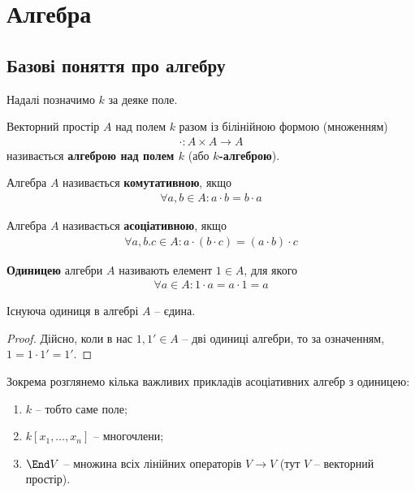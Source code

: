 \documentclass{math_library}
\begin{document}
\iffalse
\section{Алгебра}
\subsection{Базові поняття про алгебру}
Надалі позначимо $k$ за деяке поле.

\begin{definition}
Векторний простір $A$ над полем $k$ разом із білінійною формою (множенням)
\begin{align*}
\cdot \colon A \times A \to A
\end{align*}
називається \textbf{алгеброю над полем $k$} (або \textbf{$k$-алгеброю}).
\end{definition}

\begin{definition}
Алгебра $A$ називається \textbf{комутативною}, якщо
\begin{align*}
\forall a,b \in A: a \cdot b = b \cdot a
\end{align*}
\end{definition}

\begin{definition}
Алгебра $A$ називається \textbf{асоціативною}, якщо
\begin{align*}
\forall a,b.c \in A: a \cdot (b \cdot c) = (a \cdot b) \cdot c
\end{align*}
\end{definition}

\begin{definition}
\textbf{Одиницею} алгебри $A$ називають елемент $1 \in A$, для якого
\begin{align*}
\forall a \in A: 1 \cdot a = a \cdot 1 = a
\end{align*}
\end{definition}

\begin{proposition}
Існуюча одиниця в алгебрі $A$ -- єдина.
\end{proposition}

\begin{proof}
Дійсно, коли в нас $1,1' \in A$ -- дві одиниці алгебри, то за означенням, $1 = 1 \cdot 1' = 1'$.
\end{proof}

\begin{example}
Зокрема розглянемо кілька важливих прикладів асоціативних алгебр з одиницею:
\begin{enumerate}[nosep,wide=0pt,label={\arabic*)}]
\item $k$ -- тобто саме поле;
\item $k[x_1,\dots,x_n]$ -- многочлени;
\item $\End V$ -- множина всіх лінійних операторів $V \to V$ (тут $V$ -- векторний простір).
\end{enumerate}
\end{example}
\end{document}
